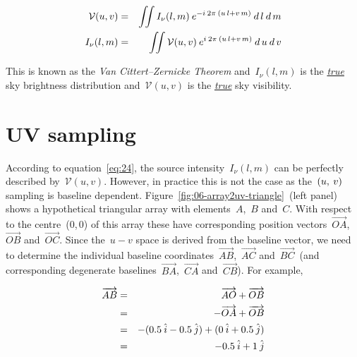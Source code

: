 \documentclass[11pt, a4paper]{article}
\newcommand{\msp}{\mkern \medmuskip}
\begin{document}
\begin{eqnarray}
  \label{eq:24}
  \begin{aligned}
  \mathcal{V}(u, v) &=& \iint I_\nu (l, m) \msp e^{-i \msp 2\pi \msp (u\,l + v\,m)} \msp d\,l \msp d\,m \\
  I_\nu (l, m) &=& \iint \mathcal{V}(u, v) \msp e^{ i \msp 2\pi \msp (u\,l + v\,m)} \msp d\,u \msp d\,v
  \end{aligned}
\end{eqnarray}

This is known as the \emph{Van Cittert--Zernicke Theorem} and~$I_\nu (l, m)$ is the \underline{\emph{true}} sky brightness distribution and~$\mathcal{V}(u, v)$ is the \underline{\emph{true}} sky visibility.

\section{UV sampling}

According to equation~\eqref{eq:24}, the source intensity~$I_\nu (l, m)$ can be perfectly described by~$\mathcal{V}(u, v)$. However, in practice this is not the case as the~$(u,\msp v)$ sampling is baseline dependent. Figure~\ref{fig:06-array2uv-triangle}~(left panel) shows a hypothetical triangular array with elements~$A$,~$B$ and~$C$. With respect to the centre~(0,\,0) of this array these have corresponding position vectors~$\overrightarrow{OA}$,~$\overrightarrow{OB}$ and~$\overrightarrow{OC}$. Since the~$u-v$ space is derived from the baseline vector, we need to determine the individual baseline coordinates~$\overrightarrow{AB}$,~$\overrightarrow{AC}$ and~$\overrightarrow{BC}$~(and corresponding degenerate baselines~$\overrightarrow{BA}$,~$\overrightarrow{CA}$ and~$\overrightarrow{CB}$). For example,

\begin{eqnarray}
  \label{eq:26}
  \overrightarrow{AB} &=&  \enspace \overrightarrow{AO} + \overrightarrow{OB} \nonumber \\
                      &=& -\overrightarrow{OA} + \overrightarrow{OB} \nonumber \\
                      &=& -(0.5\msp \hat{i} - 0.5\msp \hat{j}) + (0\msp \hat{i} + 0.5\msp \hat{j}) \nonumber \\
                      &=& -0.5\msp \hat{i} + 1\msp \hat{j} \nonumber
\end{eqnarray}
\end{document}
